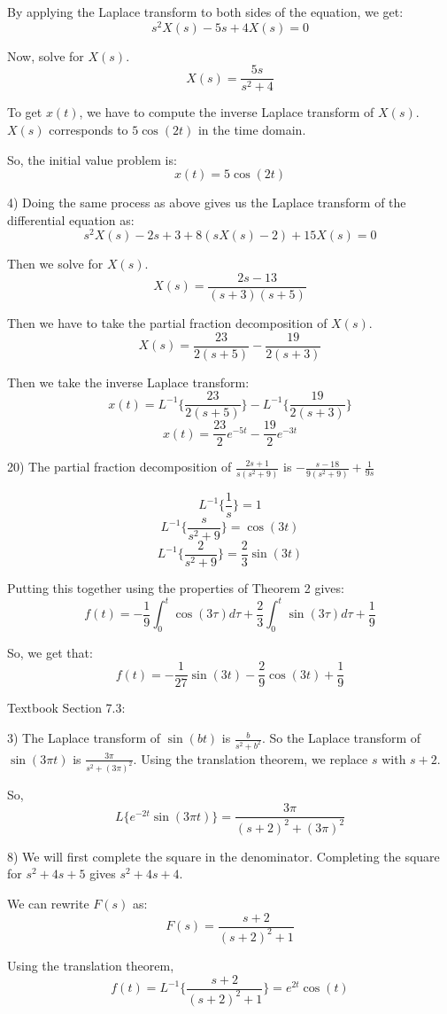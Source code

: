 \documentclass{article}
\begin{document}
By applying the Laplace transform to both sides of the equation, we get:
\[s^2 X(s) - 5s + 4 X(s) = 0\]

Now, solve for $X(s)$.
\[X(s) = \frac{5s}{s^2 + 4}\]

To get $x(t)$, we have to compute the inverse Laplace transform of $X(s)$.
$X(s)$ corresponds to $5 \cos(2t)$ in the time domain.

So, the initial value problem is:
\[x(t) = 5 \cos(2t)\]

4) Doing the same process as above gives us the Laplace transform of the differential equation as:
\[s^2 X(s) - 2s + 3 + 8(s X(s) - 2) + 15 X(s) = 0\]

Then we solve for $X(s)$.
\[X(s) = \frac{2s - 13}{(s+3)(s+5)}\]

Then we have to take the partial fraction decomposition of $X(s)$.
\[X(s) = \frac{23}{2(s+5)} - \frac{19}{2(s+3)}\]

Then we take the inverse Laplace transform:
\[x(t) = L^{-1}\{\frac{23}{2(s+5)}\} - L^{-1}\{\frac{19}{2(s+3)}\}\]
\[x(t) = \frac{23}{2} e^{-5t} - \frac{19}{2} e^{-3t}\]

20) The partial fraction decomposition of $\frac{2s+1}{s(s^2+9)}$ is
$-\frac{s-18}{9(s^2 + 9)} + \frac{1}{9s}$

\[L^{-1}\{\frac{1}{s}\} = 1\]
\[L^{-1}\{\frac{s}{s^2 + 9}\} = \cos(3t)\]
\[L^{-1}\{\frac{2}{s^2 + 9}\} = \frac{2}{3} \sin(3t)\]

Putting this together using the properties of Theorem 2 gives:
\[f(t) = -\frac{1}{9} \int_{0}^{t} \cos(3 \tau) d \tau + \frac{2}{3} \int_{0}^{t} \sin(3 \tau) d \tau + \frac{1}{9}\]

So, we get that:
\[f(t) = -\frac{1}{27} \sin(3t) - \frac{2}{9} \cos(3t) + \frac{1}{9}\]


Textbook Section 7.3:

3) The Laplace transform of $\sin(bt)$ is $\frac{b}{s^2 + b^2}$. So the Laplace
transform of $\sin(3 \pi t)$ is $\frac{3 \pi}{s^2 + (3 \pi)^2}$.
Using the translation theorem, we replace $s$ with $s + 2$.

So,
\[L\{e^{-2t} \sin(3 \pi t)\} = \frac{3 \pi}{(s+2)^2 + (3 \pi)^2}\]

8) We will first complete the square in the denominator.
Completing the square for $s^2 + 4s + 5$ gives $s^2 + 4s + 4$.

We can rewrite $F(s)$ as:
\[F(s) = \frac{s+2}{(s+2)^2 + 1}\]

Using the translation theorem,
\[f(t) = L^{-1}\{\frac{s+2}{(s+2)^2 + 1}\} = e^{2t} \cos(t)\]
\end{document}
